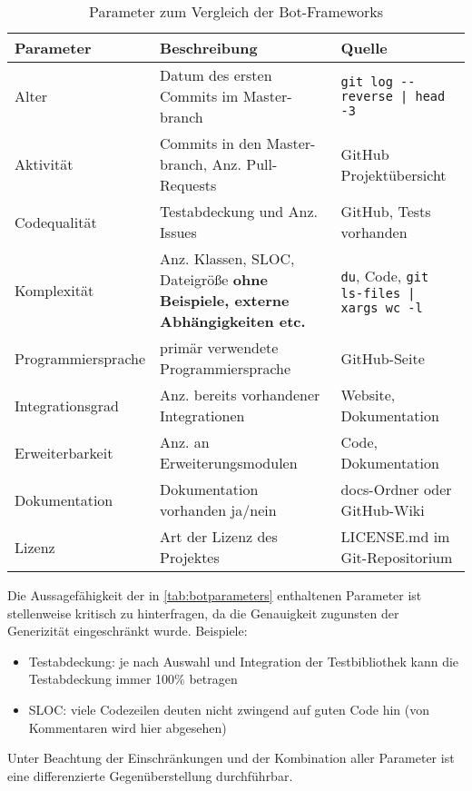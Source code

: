 \begin{table}[htbp]
    \begin{tabularx}{\textwidth}{lXp{6cm}}
   \hline
   \textbf{Parameter} & \textbf{Beschreibung} & \textbf{Quelle} \\
   \hline
   Alter & Datum des ersten Commits im Master-branch & \verb+git log --reverse | head -3+\\
   \hline
   Aktivität & Commits in den Master-branch, Anz. Pull-Requests & GitHub Projektübersicht \\
   \hline
   Codequalität & Testabdeckung und Anz. Issues & GitHub, Tests vorhanden \\
   \hline
   Komplexität & Anz. Klassen, SLOC, Dateigröße \textbf{ohne Beispiele, externe Abhängigkeiten etc.} & \verb+du+, Code, \verb+git ls-files | xargs wc -l+ \\
   \hline
   Programmiersprache & primär verwendete Programmiersprache & GitHub-Seite \\
   \hline
   Integrationsgrad & Anz. bereits vorhandener Integrationen & Website, Dokumentation \\
   \hline
   Erweiterbarkeit & Anz. an Erweiterungsmodulen & Code, Dokumentation \\
   \hline
   Dokumentation & Dokumentation vorhanden ja/nein & docs-Ordner oder GitHub-Wiki \\
   \hline
   Lizenz & Art der Lizenz des Projektes & LICENSE.md im Git-Repositorium \\
   \hline
\end{tabularx}
\caption{Parameter zum Vergleich der Bot-Frameworks}
\label{tab:botparameters}
\end{table}

Die Aussagefähigkeit der in \autoref{tab:botparameters} enthaltenen Parameter ist stellenweise kritisch zu hinterfragen, da die Genauigkeit zugunsten der Generizität eingeschränkt wurde. 
Beispiele:
\begin{itemize}
    \item Testabdeckung: je nach Auswahl und Integration der Testbibliothek kann die Testabdeckung immer 100\% betragen
\item SLOC: viele Codezeilen deuten nicht zwingend auf guten Code hin (von Kommentaren wird hier abgesehen)
\end{itemize}

Unter Beachtung der Einschränkungen und der Kombination aller Parameter ist eine differenzierte Gegenüberstellung durchführbar.

